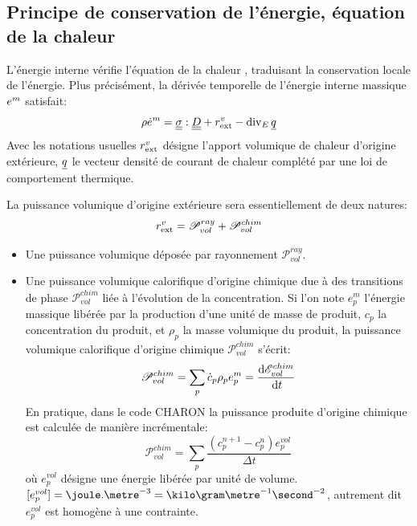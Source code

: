 \documentclass[10pt]{book}
\begin{document}
\subsection{Principe de conservation de l'énergie, équation de la chaleur}
L'énergie interne vérifie l'équation \og de la chaleur \fg{}, traduisant la conservation locale de l'énergie. Plus précisément, la dérivée temporelle de l'énergie interne massique $e^{m}$ satisfait:
\begin{equation}
\rho\dot{e}^{m}=\SC:\TD+\PCaloVol-\div_{E}\CourantChal
\label{eq:chaleur}
\end{equation}
Avec les notations usuelles $r^{v}_{\text{ext}}$ désigne l'apport volumique de chaleur d'origine extérieure, $\underline{q}$ le vecteur densité de courant de chaleur complété par une loi de comportement thermique.

La puissance volumique d'origine extérieure sera essentiellement de deux natures:
$$r^{v}_{\text{ext}}=\mathscr{P}_{vol}^{ray}+\mathscr{P}_{vol}^{chim}$$
\begin{itemize}
\item Une puissance volumique déposée par rayonnement $\mathscr{P}_{vol}^{ray}$.
\item Une puissance volumique calorifique d'origine chimique due à des transitions de phase $\mathscr{P}_{vol}^{chim}$ liée à l'évolution de la concentration. Si l'on note $e_{p}^{m}$ l'énergie massique libérée par la production d'une unité de masse de produit, $c_{p}$ la concentration du produit, et $\rho_{p}$ la masse volumique du produit, la puissance volumique calorifique d'origine chimique $\mathscr{P}_{vol}^{chim}$ s'écrit:
\begin{equation}
\mathscr{P}_{vol}^{chim} =\sum_{p} \dot{c}_{p}\rho_{p}e_{p}^{m}=\dfrac{\mathrm{d}\mathscr{E}_{vol}^{chim}}{\,\mathrm{d}t}
\label{eq:prod_origine_chimique}
\end{equation}
En pratique, dans le code CHARON la puissance produite d'origine chimique est calculée de manière incrémentale:
\begin{equation}
\mathscr{P}_{vol}^{chim} =\sum_{p} \dfrac{(c_{p}^{n+1}-c_{p}^{n})e_{p}^{vol}}{\Delta t}
\label{eq:prod_origine_chimique_incremental}
\end{equation}
où $e_{p}^{vol}$ désigne une énergie libérée par unité de volume. $[e_{p}^{vol}]=\joule.\metre^{-3}=\kilo\gram\metre^{-1}\second^{-2}$, autrement dit $e_{p}^{vol}$ est homogène à une contrainte.
\end{itemize}
\end{document}
